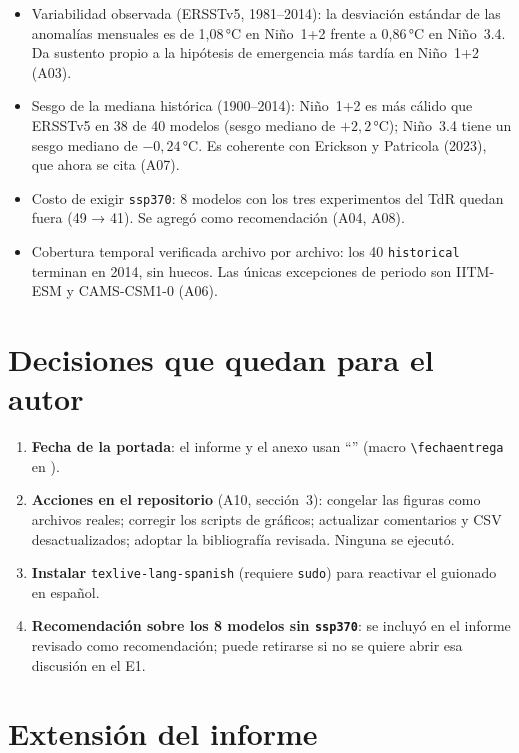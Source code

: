 \begin{itemize}[leftmargin=1.2em]
\item Variabilidad observada (ERSSTv5, 1981--2014): la desviación estándar de las anomalías mensuales es de 1{,}08\,°C en Niño~1+2 frente a 0{,}86\,°C en Niño~3.4. Da sustento propio a la hipótesis de emergencia más tardía en Niño~1+2 (A03).
\item Sesgo de la mediana histórica (1900--2014): Niño~1+2 es más cálido que ERSSTv5 en 38 de 40 modelos (sesgo mediano de $+2{,}2$\,°C); Niño~3.4 tiene un sesgo mediano de $-0{,}24$\,°C. Es coherente con Erickson y Patricola (2023), que ahora se cita (A07).
\item Costo de exigir \texttt{ssp370}: 8 modelos con los tres experimentos del TdR quedan fuera (49 → 41). Se agregó como recomendación (A04, A08).
\item Cobertura temporal verificada archivo por archivo: los 40 \texttt{historical} terminan en 2014, sin huecos. Las únicas excepciones de periodo son IITM-ESM y CAMS-CSM1-0 (A06).
\end{itemize}

\section{Decisiones que quedan para el autor}

\begin{enumerate}[leftmargin=1.5em]
\item \textbf{Fecha de la portada}: el informe y el anexo usan ``\fechaentrega'' (macro \verb|\fechaentrega| en ).
\item \textbf{Acciones en el repositorio} (A10, sección~3): congelar las figuras como archivos reales; corregir los scripts de gráficos; actualizar comentarios y CSV desactualizados; adoptar la bibliografía revisada. Ninguna se ejecutó.
\item \textbf{Instalar} \texttt{texlive-lang-spanish} (requiere \texttt{sudo}) para reactivar el guionado en español.
\item \textbf{Recomendación sobre los 8 modelos sin \texttt{ssp370}}: se incluyó en el informe revisado como recomendación; puede retirarse si no se quiere abrir esa discusión en el E1.
\end{enumerate}

\section{Extensión del informe}

